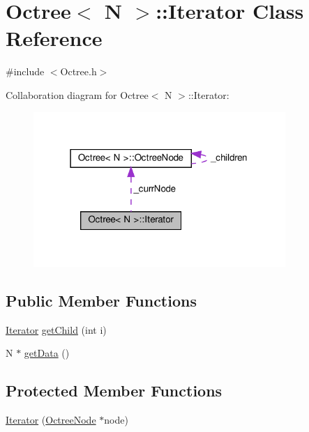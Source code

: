\hypertarget{classOctree_1_1Iterator}{}\section{Octree$<$ N $>$\+:\+:Iterator Class Reference}
\label{classOctree_1_1Iterator}


{\ttfamily \#include $<$Octree.\+h$>$}



Collaboration diagram for Octree$<$ N $>$\+:\+:Iterator\+:
\nopagebreak
\begin{figure}[H]
\begin{center}
\leavevmode
\includegraphics[width=271pt]{classOctree_1_1Iterator__coll__graph}
\end{center}
\end{figure}
\subsection*{Public Member Functions}
\begin{DoxyCompactItemize}
\item 
\hyperlink{classOctree_1_1Iterator}{Iterator} \hyperlink{classOctree_1_1Iterator_a967ccaaecd324ba6fbbd735d07d5bab8}{get\+Child} (int i)
\item 
N $\ast$ \hyperlink{classOctree_1_1Iterator_a507990201d4c1923cd137b2e1e75f1a9}{get\+Data} ()
\end{DoxyCompactItemize}
\subsection*{Protected Member Functions}
\begin{DoxyCompactItemize}
\item 
\hyperlink{classOctree_1_1Iterator_af4b294898f6586f90fbfd1aee3c42252}{Iterator} (\hyperlink{structOctree_1_1OctreeNode}{Octree\+Node} $\ast$node)
\end{DoxyCompactItemize}
